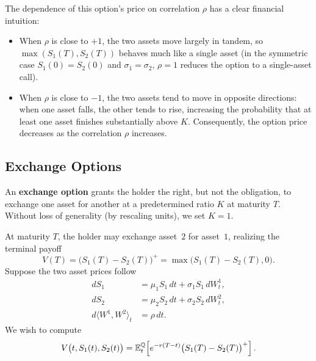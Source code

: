 The dependence of this option's price on correlation $\rho$ has a clear financial intuition:
\begin{itemize}
    \item When $\rho$ is close to $+1$, the two assets move largely in tandem, so $\max(S_1(T), S_2(T))$ behaves much like a single asset (in the symmetric case $S_1(0) = S_2(0)$ and $\sigma_1 = \sigma_2$, $\rho = 1$ reduces the option to a single-asset call).
    \item When $\rho$ is close to $-1$, the two assets tend to move in opposite directions: when one asset falls, the other tends to rise, increasing the probability that at least one asset finishes substantially above $K$. Consequently, the option price decreases as the correlation $\rho$ increases.
\end{itemize}

\subsection{Exchange Options}
\begin{definition}
    \label{def:ch04-exchange-option}
    An \textbf{exchange option} grants the holder the right, but not the obligation, to exchange one asset for another at a predetermined ratio $K$ at maturity $T$. Without loss of generality (by rescaling units), we set $K = 1$.
\end{definition}

At maturity $T$, the holder may exchange asset~$2$ for asset~$1$, realizing the terminal payoff
\[
    V(T) = \bigl(S_1(T) - S_2(T)\bigr)^+ = \max\bigl(S_1(T) - S_2(T), 0\bigr).
\]
Suppose the two asset prices follow
\begin{align*}
    dS_1 &= \mu_1 S_1\,dt + \sigma_1 S_1\,dW_t^1, \\
    dS_2 &= \mu_2 S_2\,dt + \sigma_2 S_2\,dW_t^2, \\
    d\langle W^1, W^2 \rangle_t &= \rho\,dt.
\end{align*}
We wish to compute
\[
    V\bigl(t, S_1(t), S_2(t)\bigr) = \mathbb{E}_t^{\mathbb{Q}}\!\left[e^{-r(T-t)}\bigl(S_1(T) - S_2(T)\bigr)^+\right].
\]

